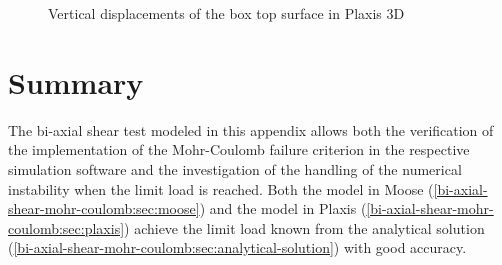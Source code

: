 \begin{figure}[htbp]
    \caption{Vertical displacements of the box top surface in Plaxis 3D}
    \label{bi-axial-shear-mohr-coulomb:fig:plaxis-results}
\end{figure}

\section{Summary}
\label{bi-axial-shear-mohr-coulomb:sec:summary}

The bi-axial shear test modeled in this appendix allows both the verification
of the implementation of the Mohr-Coulomb failure criterion in the respective
simulation software and the investigation of the handling of the numerical
instability when the limit load is reached. Both the model in Moose
(\autoref{bi-axial-shear-mohr-coulomb:sec:moose}) and the model in Plaxis
(\autoref{bi-axial-shear-mohr-coulomb:sec:plaxis}) achieve the limit load known
from the analytical solution
(\autoref{bi-axial-shear-mohr-coulomb:sec:analytical-solution}) with good
accuracy.
